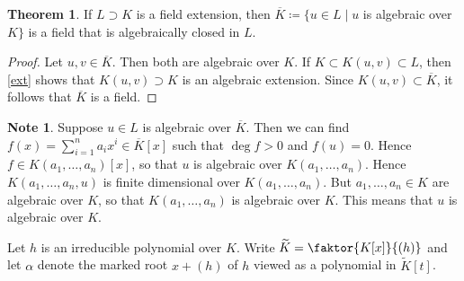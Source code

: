 \documentclass[10pt,letterpaper,cm]{nupset}
\theoremstyle{definition}
\newtheorem{note}[definition]{Note}
\theoremstyle{theorem}
\newtheorem{theorem}[definition]{Theorem}
\theoremstyle{remark}
\newcommand{\1}{\mathbf{1}}
\newcommand{\0}{\vec 0}
\begin{document}
\begin{theorem}
If $L \supset K$ is a field extension, then $\overline{K}\coloneqq  \{u\in L \mid u$ is algebraic over $K\}$ is a field that is algebraically closed in $L$.
\end{theorem}
\begin{proof}
Let $u,v \in \overline{K}$. Then both are algebraic over $K$. If $K \subset K(u,v) \subset L$, then \cref{ext} shows that $K(u,v) \supset K$ is an algebraic extension. Since $K(u,v) \subset \overline{K}$, it follows that $\overline{K}$ is a field. 
\end{proof}

\begin{note}
Suppose $u\in L$ is algebraic over $\overline{K}$. Then we can find $f(x) = \sum_{i=1}^n a_ix^i \in \overline{K}[x]$ such that $\deg{f} >0$ and $f(u) =0$. Hence $f\in K(a_1, \ldots, a_n)[x]$, so that $u$ is algebraic over $K(a_1, \ldots, a_n)$. Hence $K(a_1, \ldots, a_n, u)$ is finite dimensional over $K(a_1, \ldots, a_n)$. But $a_1, \ldots, a_n \in K$ are algebraic over $K$, so that $K(a_1, \ldots, a_n)$ is algebraic over $K$.  This means that $u$ is algebraic over $K$.

Let $h$ is an irreducible polynomial over $K$. Write $\widetilde{K} = \faktor{K[x]}{(h)}$ and let $\alpha$ denote the marked root $x+(h)$ of $h$ viewed as a polynomial in $\widetilde{K}[t]$.
\end{note}
\end{document}
